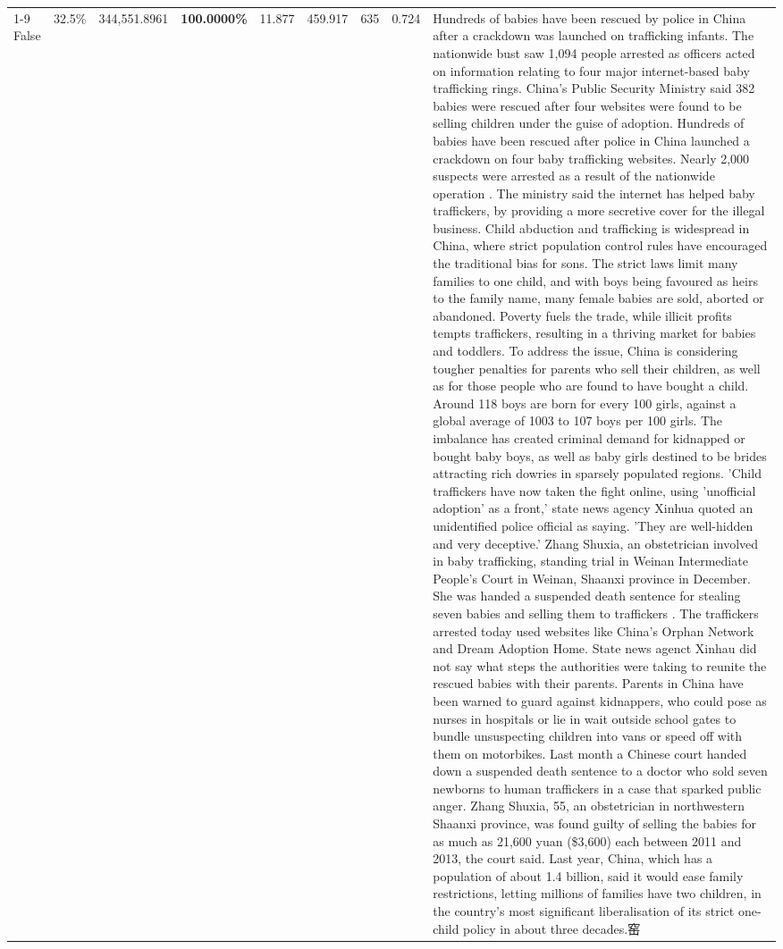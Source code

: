 \begin{table}[H]
\begin{tabular}{lllrlllll}
\cline{1-9}
False & 32.5\% & 344,551.8961 & \bfseries \color{red} 100.0000\% & 11.877 & 459.917 & 635 & 0.724 & Hundreds of babies have been rescued by police in China after a crackdown was launched on trafficking infants. The nationwide bust saw 1,094 people arrested as officers acted on information relating to four major internet-based baby trafficking rings. China's Public Security Ministry said 382 babies were rescued after four websites were found to be selling children under the guise of adoption. Hundreds of babies have been rescued after police in China launched a crackdown on four baby trafficking websites. Nearly 2,000 suspects were arrested as a result of the nationwide operation . The ministry said the internet has helped baby traffickers, by providing a more secretive cover for the illegal business. Child abduction and trafficking is widespread in China, where strict population control rules have encouraged the traditional bias for sons. The strict laws limit many families to one child, and with boys being favoured as heirs to the family name, many female babies are sold, aborted or abandoned. Poverty fuels the trade, while illicit profits tempts traffickers, resulting in a thriving market for babies and toddlers. To address the issue, China is considering tougher penalties for parents who sell their children, as well as for those people who are found to have bought a child. Around 118 boys are born for every 100 girls, against a global average of 1003 to 107 boys per 100 girls. The imbalance has created criminal demand for kidnapped or bought baby boys, as well as baby girls destined to be brides attracting rich dowries in sparsely populated regions. 'Child traffickers have now taken the fight online, using 'unofficial adoption' as a front,' state news agency Xinhua quoted an unidentified police official as saying. 'They are well-hidden and very deceptive.' Zhang Shuxia, an obstetrician involved in baby trafficking, standing trial in Weinan Intermediate People's Court in Weinan, Shaanxi province in December. She was handed a suspended death sentence for stealing seven babies and selling them to traffickers . The traffickers arrested today used websites like China's Orphan Network and Dream Adoption Home. State news agenct Xinhau did not say what steps the authorities were taking to reunite the rescued babies with their parents. Parents in China have been warned to guard against kidnappers, who could pose as nurses in hospitals or lie in wait outside school gates to bundle unsuspecting children into vans or speed off with them on motorbikes. Last month a Chinese court handed down a suspended death sentence to a doctor who sold seven newborns to human traffickers in a case that sparked public anger. Zhang Shuxia, 55, an obstetrician in northwestern Shaanxi province, was found guilty of selling the babies for as much as 21,600 yuan (\$3,600) each between 2011 and 2013, the court said. Last year, China, which has a population of about 1.4 billion, said it would ease family restrictions, letting millions of families have two children, in the country's most significant liberalisation of its strict one-child policy in about three decades.窑 \\

\end{tabular}
\end{table}
